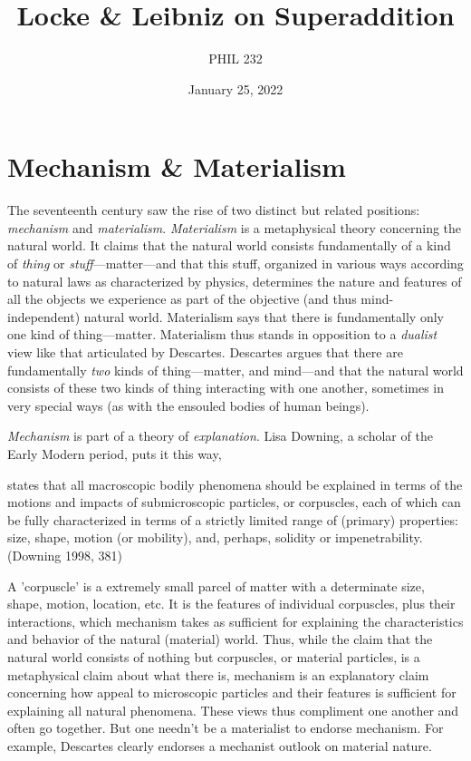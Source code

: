 \documentclass[12pt]{article}
\author{PHIL 232}
\date{January 25, 2022}
\title{Locke \& Leibniz on Superaddition}
\makeatletter
\newcommand{\citeprocitem}[2]{\hyper@linkstart{cite}{citeproc_bib_item_#1}#2\hyper@linkend}
\makeatother
\begin{document}
\maketitle
\tableofcontents

\section{Mechanism \& Materialism}
\label{sec:org9fa84ed}

The seventeenth century saw the rise of two distinct but related positions: \emph{mechanism}
and \emph{materialism}. \emph{Materialism} is a metaphysical theory concerning the natural world.
It claims that the natural world consists fundamentally of a kind of \emph{thing} or
\emph{stuff}---matter---and that this stuff, organized in various ways according to natural
laws as characterized by physics, determines the nature and features of all the
objects we experience as part of the objective (and thus mind-independent) natural
world. Materialism says that there is fundamentally only one kind of thing---matter.
Materialism thus stands in opposition to a \emph{dualist} view like that articulated by
Descartes. Descartes argues that there are fundamentally \emph{two} kinds of thing---matter,
and mind---and that the natural world consists of these two kinds of thing
interacting with one another, sometimes in very special ways (as with the ensouled
bodies of human beings).

\emph{Mechanism} is part of a theory of \emph{explanation}. Lisa Downing, a scholar of the Early
Modern period, puts it this way,

\begin{quote-b}
 states that all macroscopic bodily phenomena
should be explained in terms of the motions and impacts of
submicroscopic particles, or corpuscles, each of which can be fully
characterized in terms of a strictly limited range of (primary)
properties: size, shape, motion (or mobility), and, perhaps, solidity
or impenetrability. (\citeprocitem{4}{Downing 1998, 381})
\end{quote-b}

A 'corpuscle' is a extremely small parcel of matter with a determinate size, shape,
motion, location, etc. It is the features of individual corpuscles, plus their
interactions, which mechanism takes as sufficient for explaining the characteristics
and behavior of the natural (material) world. Thus, while the claim that the natural
world consists of nothing but corpuscles, or material particles, is a metaphysical
claim about what there is, mechanism is an explanatory claim concerning how appeal to
microscopic particles and their features is sufficient for explaining all natural
phenomena. These views thus compliment one another and often go together. But one
needn't be a materialist to endorse mechanism. For example, Descartes clearly
endorses a mechanist outlook on material nature.
\end{document}
